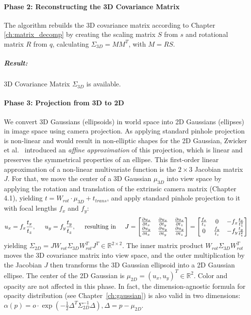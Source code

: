 \vspace{-5pt}
\paragraph{Phase 2: Reconstructing the 3D Covariance Matrix} The algorithm rebuilds the 3D covariance matrix according to Chapter \ref{ch:matrix_decomp} by creating the scaling matrix $S$ from $s$ and rotational matrix $R$ from $q$, calculating $\Sigma_{3D} = M M^T$, with $M = RS$.
\subparagraph{Result:} 3D Covariance Matrix $\Sigma_{3D}$ is available.

\vspace{-5pt} 
\paragraph{Phase 3: Projection from 3D to 2D} We convert 3D Gaussians (ellipsoids) in world space into 2D Gaussians (ellipses) in image space using camera projection. 
As applying standard pinhole projection~\cite{marschnerFundamentalsComputerGraphics2021} is non-linear and would result in non-elliptic shapes for the 2D Gaussian, Zwicker et al.~\cite{zwickerEWAVolumeSplatting2001} introduced an \textit{affine approximation} of this projection, which is linear and preserves the symmetrical properties of an ellipse.
This first-order linear approximation of a non-linear multivariate function is the $2\times 3$ Jacobian matrix~$J$.\linebreak
For that, we move the center of a 3D Gaussian $\mu_{3D}$ into view space by applying the rotation and translation of the extrinsic camera matrix (Chapter 4.1), yielding $t = W_{rot} \cdot \mu_{3D} + t_{trans}$, and apply standard pinhole projection to it with focal lengths $f_x$ and $f_y$:
$$
u_x = f_x \frac{t_x}{t_z}, \hspace{0.5cm}
u_y = f_y \frac{t_y}{t_z}, \hspace{0.5cm}
\text{resulting in} \hspace{0.5cm} 
J = \begin{bmatrix} 
    \frac{\partial u_x}{\partial t_x} & \frac{\partial u_x}{\partial t_y} & \frac{\partial u_x}{\partial t_z} \\
    \frac{\partial u_y}{\partial t_x} & \frac{\partial u_y}{\partial t_y} & \frac{\partial u_y}{\partial t_z}
\end{bmatrix} = 
\begin{bmatrix} 
    \frac{f_x}{t_z} & 0 & -f_x \frac{t_x}{t_z^2} \\
    0 & \frac{f_y}{t_z} & -f_y \frac{t_y}{t_z^2}
\end{bmatrix}
$$
yielding $\Sigma_{2D} = J W_{rot} \Sigma_{3D} W_{rot}^T J^T \in \mathbb{R}^{2\times 2}$. The inner matrix product $W_{rot} \Sigma_{3D} W_{rot}^T$ moves the 3D covariance matrix into view space, and the outer multiplication by the Jacobian $J$ then transforms the 3D Gaussian ellipsoid into a 2D Gaussian ellipse.
The center of the 2D Gaussian is $\mu_{2D}=(u_x, u_y)^T \in \mathbb{R}^2$. Color and opacity are not affected in this phase. In fact, the dimension-agnostic formula for opacity distribution (see Chapter~\ref{ch:gaussian}) is also valid in two dimensions: $\alpha(p) = o \cdot \exp\left(-\frac{1}{2}\Delta^T \Sigma^{-1}_{2D}\Delta\right), \Delta = p - \mu_{2D}$.

